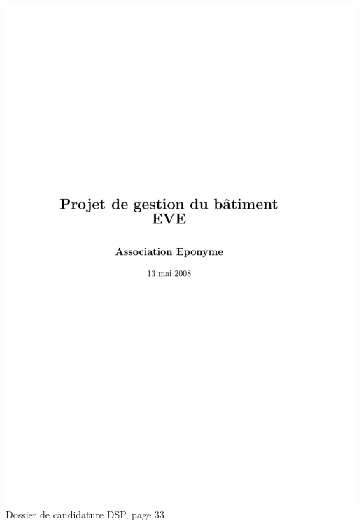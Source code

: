 \includegraphics[scale=0.85,trim=20mm 20mm 20mm 20mm,clip,page=33]{annexes/candidature_dsp.pdf} \\
Dossier de candidature DSP, page 33
\newpage
